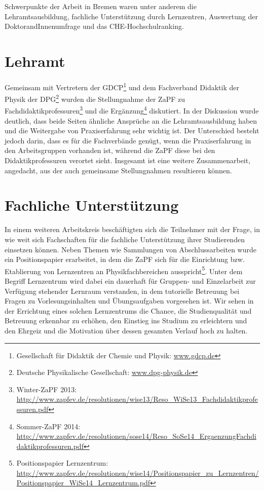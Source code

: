 \documentclass{scrartcl}
\renewcommand{\headrulewidth}{0pt}
\begin{document}
Schwerpunkte der Arbeit in Bremen waren unter anderem die Lehramtsausbildung, fachliche Unterst\"utzung durch Lernzentren, Auswertung der DoktorandInnenumfrage und das CHE-Hochschulranking.

\pagebreak
\renewcommand{\headrulewidth}{0.1pt}
\rhead{\thepage}

\section*{Lehramt}
Gemeinsam mit Vertretern der GDCP\footnote{Gesellschaft f\"ur Didaktik der Chemie und Physik: \href{http://www.gdcp.de}{\url{www.gdcp.de}}} und dem Fachverband Didaktik der Physik der DPG\footnote{Deutsche Physikalische Gesellschaft: \href{http://www.dpg-physik.de}{\url{www.dpg-physik.de}}} wurden die Stellungnahme der ZaPF zu Fachdidaktikprofessuren\footnote{Winter-ZaPF 2013: \href{http://www.zapfev.de/resolutionen/wise13/Reso\_WiSe13\_Fachdidaktikprofessuren.pdf}{\url{http://www.zapfev.de/resolutionen/wise13/Reso\_WiSe13\_Fachdidaktikprofessuren.pdf}}} und die Ergänzung\footnote{Sommer-ZaPF 2014: \href{http://www.zapfev.de/resolutionen/sose14/Reso\_SoSe14\_ErgaenzungFachdidaktikprofessuren.pdf}{\url{http://www.zapfev.de/resolutionen/sose14/Reso\_SoSe14\_ErgaenzungFachdidaktikprofessuren.pdf}}} diskutiert. In der Diskussion wurde deutlich, dass beide Seiten ähnliche Ansprüche an die Lehramtsausbildung haben und die Weitergabe von Praxiserfahrung sehr wichtig ist. Der Unterschied besteht jedoch darin, dass es für die Fachverbände genügt, wenn die Praxiserfahrung in den Arbeitsgruppen vorhanden ist, während die ZaPF diese bei den Didaktikprofessuren verortet sieht. Insgesamt ist eine weitere Zusammenarbeit, angedacht, aus der auch gemeinsame Stellungnahmen resultieren können.

\section*{Fachliche Unterstützung}
In einem weiteren Arbeitskreis beschäftigten sich die Teilnehmer mit der Frage, in wie weit sich Fachschaften für die fachliche Unterstützung ihrer Studierenden einsetzen können. 
Neben Themen wie Sammlungen von Abschlussarbeiten wurde ein Positionspapier erarbeitet, in dem die ZaPF sich für die Einrichtung bzw. Etablierung von Lernzentren an Physikfachbereichen ausspricht\footnote{Positionspapier Lernzentrum: \href{http://www.zapfev.de/resolutionen/wise14/Positionspapier\_zu\_Lernzentren/Positionspapier\_WiSe14\_Lernzentrum.pdf}{\url{http://www.zapfev.de/resolutionen/wise14/Positionspapier\_zu\_Lernzentren/Positionspapier\_WiSe14\_Lernzentrum.pdf}}}. Unter dem Begriff Lernzentrum wird dabei ein dauerhaft für Gruppen- und Einzelarbeit zur Verfügung stehender Lernraum verstanden, in dem tutorielle Betreuung bei Fragen zu Vorlesungsinhalten und Übungsaufgaben vorgesehen ist. Wir sehen in der Errichtung eines solchen Lernzentrums die Chance, die Studienqualität und Betreuung erkennbar zu erhöhen, den Einstieg ins Studium zu erleichtern und den Ehrgeiz und die Motivation über dessen gesamten Verlauf hoch zu halten.
\end{document}
